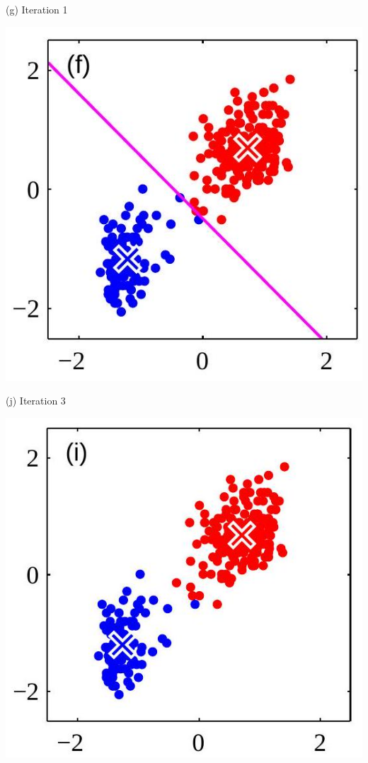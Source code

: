 \documentclass[10pt]{article}
\begin{document}
(g) Iteration 1

\begin{center}
\includegraphics[max width=\textwidth]{2023_12_30_43b7e6c218cb987b5fcag-6(7)}
\end{center}

(j) Iteration 3

\begin{center}
\includegraphics[max width=\textwidth]{2023_12_30_43b7e6c218cb987b5fcag-6(2)}
\end{center}
\end{document}
